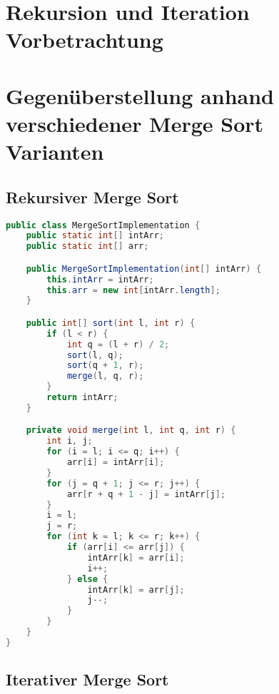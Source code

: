 \section{Rekursion und Iteration Vorbetrachtung}
\section{Gegenüberstellung anhand verschiedener Merge Sort Varianten}
\subsection{Rekursiver Merge Sort}

\begin{lstlisting}[language=java,caption={rekursiver Merge sort (Quelle: \cite{MergeSortRekursiv})},label=lst:MergeSortRekursiv]
public class MergeSortImplementation {
    public static int[] intArr;
    public static int[] arr;

    public MergeSortImplementation(int[] intArr) {
        this.intArr = intArr;
        this.arr = new int[intArr.length];
    }

    public int[] sort(int l, int r) {
        if (l < r) {
            int q = (l + r) / 2;
            sort(l, q);
            sort(q + 1, r);
            merge(l, q, r);
        }
        return intArr;
    }

    private void merge(int l, int q, int r) {
        int i, j;
        for (i = l; i <= q; i++) {
            arr[i] = intArr[i];
        }
        for (j = q + 1; j <= r; j++) {
            arr[r + q + 1 - j] = intArr[j];
        }
        i = l;
        j = r;
        for (int k = l; k <= r; k++) {
            if (arr[i] <= arr[j]) {
                intArr[k] = arr[i];
                i++;
            } else {
                intArr[k] = arr[j];
                j--;
            }
        }
    }
}
\end{lstlisting}

\subsection{Iterativer Merge Sort}

